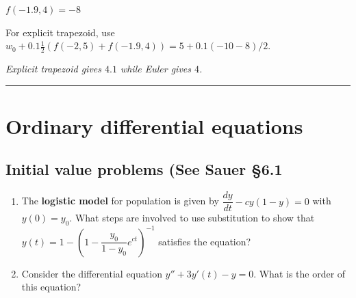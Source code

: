 \documentclass[12pt,letterpaper,noanswers]{exam}
\begin{document}
$f(-1.9,4) = -8$

For explicit trapezoid, use $w_0 + 0.1 \frac{1}{2}(f(-2,5) +f(-1.9,4)) = 5+0.1(-10-8)/2$.

\emph{Explicit trapezoid gives $4.1$ while Euler gives $4$.}

\vspace{0.2cm}
\hrule
\vspace{0.2cm}



\section*{Ordinary differential equations}
\subsection*{Initial value problems (See Sauer \S 6.1}

\begin{enumerate}[resume=classQ]
\item The \textbf{logistic model} for population is given by $\dfrac{dy}{dt} - cy(1-y) = 0$ with  $y(0) = y_0$.  What steps are involved to use substitution to show that $y(t) = 1 - \left(1-\dfrac{y_0}{1-y_0}e^{ct}\right)^{-1}$ satisfies the equation?
\vspace{1in}
\item Consider the differential equation $y'' + 3y'(t) - y = 0$.  What is the order of this equation?
\vspace{1cm}
\end{enumerate}
\end{document}
